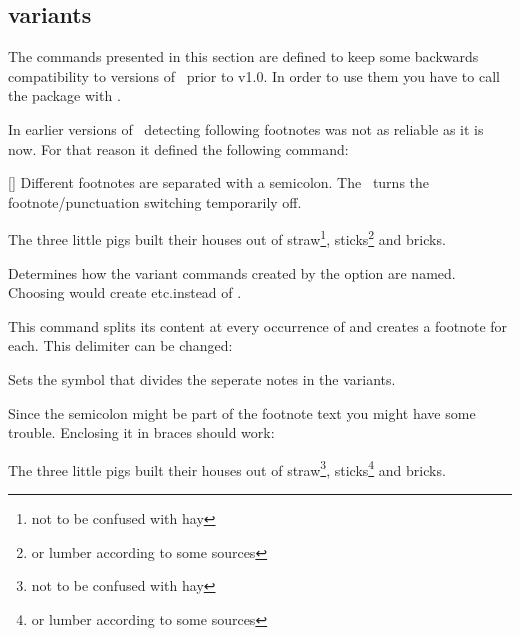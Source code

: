 \documentclass{fnpct-manual}
\begin{document}
\subsection{ variants}

\begin{bewareofthedog}
  The commands presented in this section are defined to keep some backwards
  compatibility to versions of \fnpct\ prior to v1.0.  In order to use them
  you have to call the package with
  .
\end{bewareofthedog}
In earlier versions of \fnpct\ detecting following footnotes was not as
reliable as it is now.  For that reason it defined the following command:
\begin{commands}
  [\sarg{}]
    Different footnotes are separated with a semicolon.  The \sarg\ turns the
    footnote/punctuation switching temporarily off.
\end{commands}
\begin{example}
  The three little pigs built their houses out of straw\footnote{not to be
    confused with hay}, sticks\footnote{or lumber according to some sources}
  and bricks.
\end{example}
\begin{options}
    Determines how the variant commands created by the
     option are named.  Choosing
     would create  etc.\@ instead
    of .
\end{options}
  
This command splits its content at every occurrence of \code{;} and creates a
footnote for each.  This delimiter can be changed:
\begin{options}
  \Default{;}
    Sets the symbol that divides the seperate notes in the 
    variants.
\end{options}

Since the semicolon might be part of the footnote text you might have some
trouble.  Enclosing it in braces should work:
\begin{example}
  The three little pigs built their houses out of straw\footnote{not to be
    confused with hay}, sticks\footnote{or lumber according to some sources}
  and bricks.
\end{example}
\end{document}
